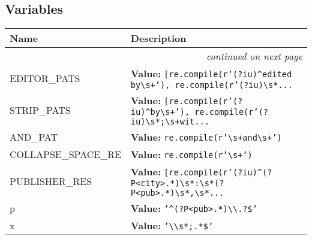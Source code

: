 
  \subsection{Variables}

    \vspace{-1cm}
\hspace{\varindent}\begin{longtable}{|p{\varnamewidth}|p{\vardescrwidth}|l}
\cline{1-2}
\cline{1-2} \centering \textbf{Name} & \centering \textbf{Description}& \\
\cline{1-2}
\endhead\cline{1-2}\multicolumn{3}{r}{\small\textit{continued on next page}}\\\endfoot\cline{1-2}
\endlastfoot\raggedright E\-D\-I\-T\-O\-R\-\_\-P\-A\-T\-S\- & \raggedright \textbf{Value:} 
{\tt \texttt{[}re.compile(r'\texttt{(?iu)}{\textasciicircum}edited by{\textbackslash}s\texttt{+}')\texttt{, }re.compile(r'\texttt{(?iu)}{\textbackslash}s\texttt{*}\texttt{...}}&\\
\cline{1-2}
\raggedright S\-T\-R\-I\-P\-\_\-P\-A\-T\-S\- & \raggedright \textbf{Value:} 
{\tt \texttt{[}re.compile(r'\texttt{(?iu)}{\textasciicircum}by{\textbackslash}s\texttt{+}')\texttt{, }re.compile(r'\texttt{(?iu)}{\textbackslash}s\texttt{*};{\textbackslash}s\texttt{+}wit\texttt{...}}&\\
\cline{1-2}
\raggedright A\-N\-D\-\_\-P\-A\-T\- & \raggedright \textbf{Value:} 
{\tt re.compile(r'{\textbackslash}s\texttt{+}and{\textbackslash}s\texttt{+}')}&\\
\cline{1-2}
\raggedright C\-O\-L\-L\-A\-P\-S\-E\-\_\-S\-P\-A\-C\-E\-\_\-R\-E\- & \raggedright \textbf{Value:} 
{\tt re.compile(r'{\textbackslash}s\texttt{+}')}&\\
\cline{1-2}
\raggedright P\-U\-B\-L\-I\-S\-H\-E\-R\-\_\-R\-E\-S\- & \raggedright \textbf{Value:} 
{\tt \texttt{[}re.compile(r'\texttt{(?iu)}{\textasciicircum}\texttt{(?P{\textless}}\texttt{city}\texttt{{\textgreater}}.\texttt{*}\texttt{)}{\textbackslash}s\texttt{*}:{\textbackslash}s\texttt{*}\texttt{(?P{\textless}}\texttt{pub}\texttt{{\textgreater}}.\texttt{*}\texttt{)}{\textbackslash}s\texttt{*},{\textbackslash}s\texttt{*}\texttt{...}}&\\
\cline{1-2}
\raggedright p\- & \raggedright \textbf{Value:} 
{\tt \texttt{'}\texttt{{\textasciicircum}(?P{\textless}pub{\textgreater}.*){\textbackslash}{\textbackslash}.?\$}\texttt{'}}&\\
\cline{1-2}
\raggedright x\- & \raggedright \textbf{Value:} 
{\tt \texttt{'}\texttt{{\textbackslash}{\textbackslash}s*;.*\$}\texttt{'}}&\\
\cline{1-2}
\end{longtable}

